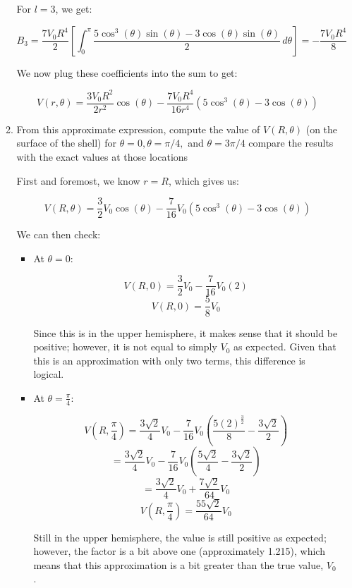 \begin{enumerate}
\begin{enumerate}
        For $l=3$, we get:

        $$B_3=\frac{7V_0R^4}{2}\left[  \int_0^{\pi}\frac{5\cos^3(\theta)\sin(\theta)-3\cos(\theta)\sin(\theta)}{2}\,d\theta\right]=-\frac{7V_0R^4}{8}$$

        We now plug these coefficients into the sum to get:

        $$\boxed{V(r,\theta)=\frac{3V_0R^2}{2r^2}\cos(\theta)-\frac{7V_0R^4}{16r^4}\left( 5\cos^3(\theta)-3\cos(\theta) \right)}$$

      \item From this approximate expression, compute the value of $V(R, \theta)$ (on the surface of the shell) for $\theta = 0, \theta = \pi/4,$ and $\theta = 3\pi/4$ compare the results with the exact values at those locations

        First and foremost, we know $r=R$, which gives us:

        $$V(R,\theta)=\frac{3}{2}V_0\cos(\theta)-\frac{7}{16}V_0\left( 5\cos^3(\theta)-3\cos(\theta) \right)$$

        We can then check:

        \begin{itemize}

          \item At $\theta=0$:

            $$V(R,0)=\frac{3}{2}V_0-\frac{7}{16}V_0(2)$$
            $$\boxed{V(R,0)=\frac{5}{8}V_0}$$

            Since this is in the upper hemisphere, it makes sense that it should be positive; however, it is not equal to simply $V_0$ as expected. Given that this is an approximation with only two terms, this difference is logical.

          \item At $\theta=\frac{\pi}{4}$:

            $$V\left( R,\frac{\pi}{4} \right)=\frac{3\sqrt{2}}{4}V_0-\frac{7}{16}V_0\left( \frac{5(2)^{\frac{3}{2}}}{8}-\frac{3\sqrt{2}}{2} \right)$$
            $$=\frac{3\sqrt{2}}{4}V_0-\frac{7}{16}V_0\left( \frac{5\sqrt{2}}{4}-\frac{3\sqrt{2}}{2} \right)$$
            $$=\frac{3\sqrt{2}}{4}V_0+\frac{7\sqrt{2}}{64}V_0$$
            $$\boxed{V\left( R,\frac{\pi}{4} \right)=\frac{55\sqrt{2}}{64}V_0}$$

            Still in the upper hemisphere, the value is still positive as expected; however, the factor is a bit above one (approximately 1.215), which means that this approximation is a bit greater than the true value, $V_0$.


\end{itemize}
\end{enumerate}
\end{enumerate}
